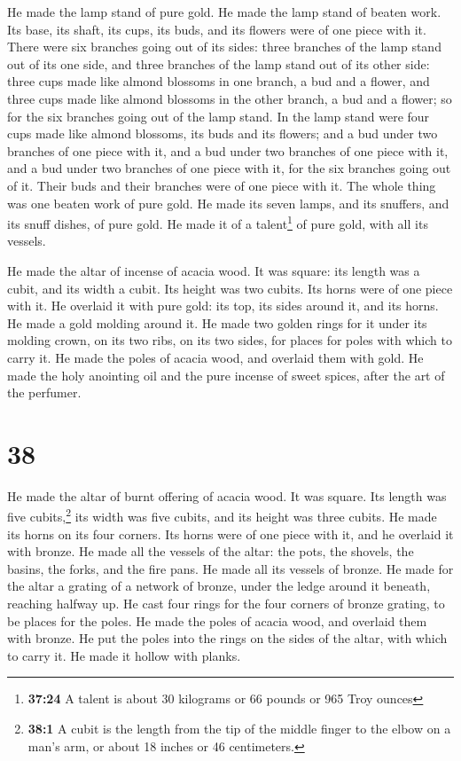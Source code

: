  He made the lamp stand of pure gold. He made the lamp
stand of beaten work. Its base, its shaft, its cups, its buds, and its
flowers were of one piece with it.  There were six
branches going out of its sides: three branches of the lamp stand out of
its one side, and three branches of the lamp stand out of its other
side:  three cups made like almond blossoms in one
branch, a bud and a flower, and three cups made like almond blossoms in
the other branch, a bud and a flower; so for the six branches going out
of the lamp stand.  In the lamp stand were four cups made
like almond blossoms, its buds and its flowers;  and a
bud under two branches of one piece with it, and a bud under two
branches of one piece with it, and a bud under two branches of one piece
with it, for the six branches going out of it.  Their
buds and their branches were of one piece with it. The whole thing was
one beaten work of pure gold.  He made its seven lamps,
and its snuffers, and its snuff dishes, of pure gold.  He
made it of a talent\footnote{\textbf{37:24} A talent is about 30
  kilograms or 66 pounds or 965 Troy ounces} of pure gold, with all its
vessels.

 He made the altar of incense of acacia wood. It was
square: its length was a cubit, and its width a cubit. Its height was
two cubits. Its horns were of one piece with it.  He
overlaid it with pure gold: its top, its sides around it, and its horns.
He made a gold molding around it.  He made two golden
rings for it under its molding crown, on its two ribs, on its two sides,
for places for poles with which to carry it.  He made the
poles of acacia wood, and overlaid them with gold.  He
made the holy anointing oil and the pure incense of sweet spices, after
the art of the perfumer.

\hypertarget{section-37}{%
\section{38}\label{section-37}}

 He made the altar of burnt offering of acacia wood. It
was square. Its length was five cubits,\footnote{\textbf{38:1} A cubit
  is the length from the tip of the middle finger to the elbow on a
  man's arm, or about 18 inches or 46 centimeters.} its width was five
cubits, and its height was three cubits.  He made its
horns on its four corners. Its horns were of one piece with it, and he
overlaid it with bronze.  He made all the vessels of the
altar: the pots, the shovels, the basins, the forks, and the fire pans.
He made all its vessels of bronze.  He made for the altar
a grating of a network of bronze, under the ledge around it beneath,
reaching halfway up.  He cast four rings for the four
corners of bronze grating, to be places for the poles.  He
made the poles of acacia wood, and overlaid them with bronze.
 He put the poles into the rings on the sides of the
altar, with which to carry it. He made it hollow with planks.

